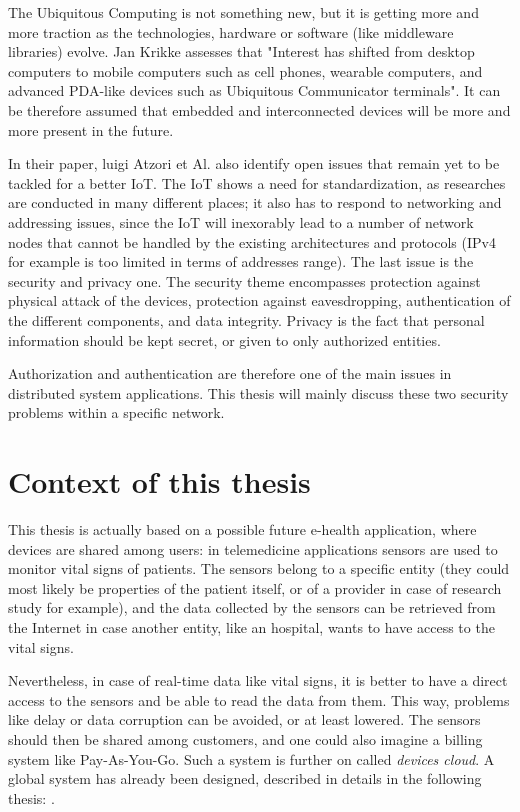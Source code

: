 The Ubiquitous Computing is not something new, but it is getting more and more traction as the technologies, hardware or software (like middleware libraries) evolve. Jan Krikke assesses that "Interest has shifted from desktop computers to mobile computers such as cell phones, wearable computers, and advanced PDA-like devices such as Ubiquitous Communicator terminals"\cite{Krikke2005}. It can be therefore assumed that embedded and interconnected devices will be more and more present in the future.

In their paper, luigi Atzori et Al. also identify open issues that remain yet to be tackled for a better IoT. The IoT shows a need for standardization, as researches are conducted in many different places; it also has to respond to networking and addressing issues, since the IoT will inexorably lead to a number of network nodes that cannot be handled by the existing architectures and protocols (IPv4 for example is too limited in terms of addresses range). The last issue is the security and privacy one. The security theme encompasses protection against physical attack of the devices,  protection against eavesdropping, authentication of the different components, and data integrity. Privacy is the fact that personal information should be kept secret, or given to only authorized entities. 

Authorization and authentication are therefore one of the main issues in distributed system applications. This thesis will mainly discuss these two security problems within a specific network. 

\section{Context of this thesis}

This thesis is actually based on a possible future e-health application, where devices are shared among users: in telemedicine applications sensors are used to monitor vital signs of patients. The sensors belong to a specific entity (they could most likely be properties of the patient itself, or of a provider in case of research study for example), and the data collected by the sensors can be retrieved from the Internet in case another entity, like an hospital, wants to have access to the vital signs. 

Nevertheless, in case of real-time data like vital signs, it is better to have a direct access to the sensors and be able to read the data from them. This way, problems like delay or data corruption can be avoided, or at least lowered. The sensors should then be shared among customers, and one could also imagine a billing system like Pay-As-You-Go. Such a system is further on called \emph{devices cloud}. A global system has already been designed, described in details in the following thesis:  \cite{reference_thesis}.

